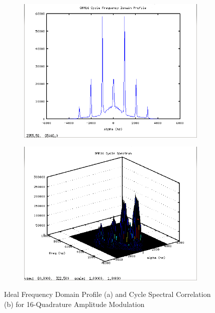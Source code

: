 \begin{figure}
\centering
\begin{subfigure}{.49\textwidth}
\centering
\includegraphics[width=\linewidth]{../img/Report_QAM16_Ia_Ideal.png}
  \caption{ }
\end{subfigure}
\begin{subfigure}{.49\textwidth}
  \centering
  \includegraphics[width=\linewidth]{../img/Report_QAM16_Sxa_Ideal.png}
  \caption{ }
\end{subfigure}
\caption{Ideal Frequency Domain Profile (a) and Cycle Spectral Correlation (b)
for 16-Quadrature Amplitude Modulation}
\label{fig:IdealQAM16Cyclo}
\end{figure}

